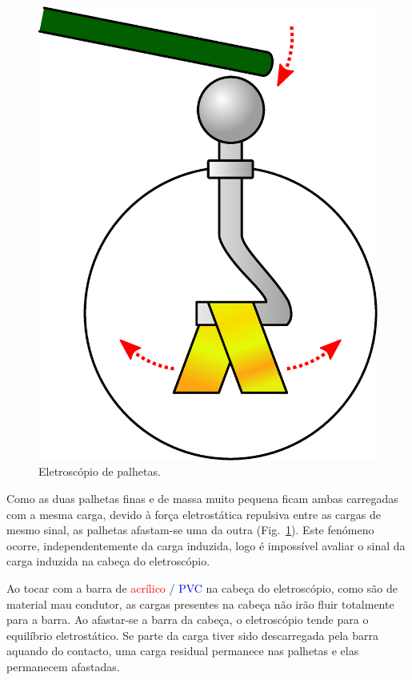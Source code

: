 \documentclass[11pt,a4paper,final]{article}
\begin{document}
\begin{figure}[h]
\centering
\includegraphics[scale=0.2]{electroscope.eps}
\caption{\label{fig:eletroscopio}Eletrosc\'{o}pio de palhetas.}
\end{figure}

Como as duas palhetas finas e de massa muito pequena ficam ambas carregadas com a mesma carga, devido \`{a} for\c{c}a eletrost\'{a}tica repulsiva entre as cargas de mesmo sinal, as palhetas afastam-se uma da outra (Fig.~\ref{fig:eletroscopio}). Este fen\'{o}meno ocorre, independentemente da carga induzida, logo \'{e} imposs\'{i}vel avaliar o sinal da carga induzida na cabe\c{c}a do eletrosc\'{o}pio.

Ao tocar com a barra de \textcolor{red}{acr\'{i}lico} / \textcolor{blue}{PVC} na cabe\c{c}a do eletrosc\'{o}pio, como s\~{a}o de material mau condutor, as cargas presentes na cabe\c{c}a n\~{a}o ir\~{a}o fluir totalmente para a barra. Ao afastar-se a barra da cabe\c{c}a, o eletrosc\'{o}pio tende para o equil\'{i}brio eletrost\'{a}tico. Se parte da carga tiver sido descarregada pela barra aquando do contacto, uma carga residual permanece nas palhetas e elas permanecem afastadas.
\end{document}

